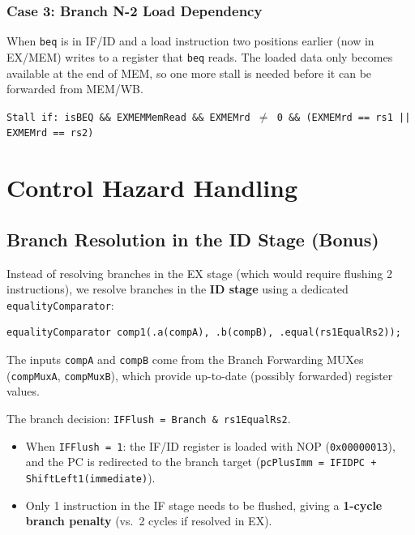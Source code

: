 \documentclass[12pt,a4paper]{article}
\begin{document}
\subsubsection{Case 3: Branch N-2 Load Dependency}
When \texttt{beq} is in IF/ID and a load instruction two positions earlier (now in EX/MEM) writes to a register that \texttt{beq} reads. The loaded data only becomes available at the end of MEM, so one more stall is needed before it can be forwarded from MEM/WB.

\texttt{Stall if: isBEQ \&\& EXMEMMemRead \&\& EXMEMrd $\neq$ 0 \&\& (EXMEMrd == rs1 || EXMEMrd == rs2)}

\section{Control Hazard Handling}

\subsection{Branch Resolution in the ID Stage (Bonus)}

Instead of resolving branches in the EX stage (which would require flushing 2 instructions), we resolve branches in the \textbf{ID stage} using a dedicated \texttt{equalityComparator}:

\begin{lstlisting}[style=verilog, numbers=none]
equalityComparator comp1(.a(compA), .b(compB), .equal(rs1EqualRs2));
\end{lstlisting}

The inputs \texttt{compA} and \texttt{compB} come from the Branch Forwarding MUXes (\texttt{compMuxA}, \texttt{compMuxB}), which provide up-to-date (possibly forwarded) register values.

The branch decision: \texttt{IFFlush = Branch \& rs1EqualRs2}.
\begin{itemize}
    \item When \texttt{IFFlush = 1}: the IF/ID register is loaded with NOP (\texttt{0x00000013}), and the PC is redirected to the branch target (\texttt{pcPlusImm = IFIDPC + ShiftLeft1(immediate)}).
    \item Only 1 instruction in the IF stage needs to be flushed, giving a \textbf{1-cycle branch penalty} (vs.\ 2 cycles if resolved in EX).
\end{itemize}
\end{document}
